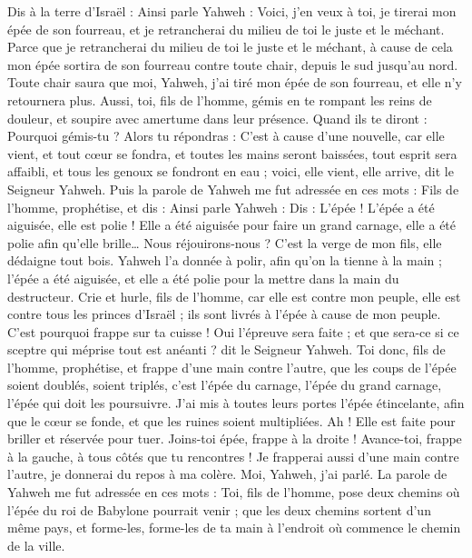 \begin{multicols}{2}
Dis à la terre d'Israël : Ainsi parle Yahweh : Voici, j'en veux à toi, je tirerai mon épée de son fourreau, et je retrancherai du milieu de toi le juste et le méchant.
Parce que je retrancherai du milieu de toi le juste et le méchant, à cause de cela mon épée sortira de son fourreau contre toute chair, depuis le sud jusqu'au nord.
Toute chair saura que moi, Yahweh, j'ai tiré mon épée de son fourreau, et elle n'y retournera plus.
Aussi, toi, fils de l’homme, gémis en te rompant les reins de douleur, et soupire avec amertume dans leur présence.
Quand ils te diront : Pourquoi gémis-tu ? Alors tu répondras : C'est à cause d’une nouvelle, car elle vient, et tout cœur se fondra, et toutes les mains seront baissées, tout esprit sera affaibli, et tous les genoux se fondront en eau ; voici, elle vient, elle arrive, dit le Seigneur Yahweh.
Puis la parole de Yahweh me fut adressée en ces mots :
Fils de l’homme, prophétise, et dis : Ainsi parle Yahweh : Dis : L'épée ! L'épée a été aiguisée, elle est polie !
Elle a été aiguisée pour faire un grand carnage, elle a été polie afin qu'elle brille… Nous réjouirons-nous ? C'est la verge de mon fils, elle dédaigne tout bois.
Yahweh l'a donnée à polir, afin qu'on la tienne à la main ; l'épée a été aiguisée, et elle a été polie pour la mettre dans la main du destructeur.
Crie et hurle, fils de l’homme, car elle est contre mon peuple, elle est contre tous les princes d'Israël ; ils sont livrés à l'épée à cause de mon peuple. C'est pourquoi frappe sur ta cuisse !
Oui l’épreuve sera faite ; et que sera-ce si ce sceptre qui méprise tout est anéanti ? dit le Seigneur Yahweh.
Toi donc, fils de l’homme, prophétise, et frappe d'une main contre l'autre, que les coups de l'épée soient doublés, soient triplés, c’est l’épée du carnage, l’épée du grand carnage, l’épée qui doit les poursuivre.
J'ai mis à toutes leurs portes l'épée étincelante, afin que le cœur se fonde, et que les ruines soient multipliées. Ah ! Elle est faite pour briller et réservée pour tuer.
Joins-toi épée, frappe à la droite ! Avance-toi, frappe à la gauche, à tous côtés que tu rencontres !
Je frapperai aussi d'une main contre l'autre, je donnerai du repos à ma colère. Moi, Yahweh, j'ai parlé.
La parole de Yahweh me fut adressée en ces mots :
Toi, fils de l’homme, pose deux chemins où l'épée du roi de Babylone pourrait venir ; que les deux chemins sortent d'un même pays, et forme-les, forme-les de ta main à l'endroit où commence le chemin de la ville.

\end{multicols}
